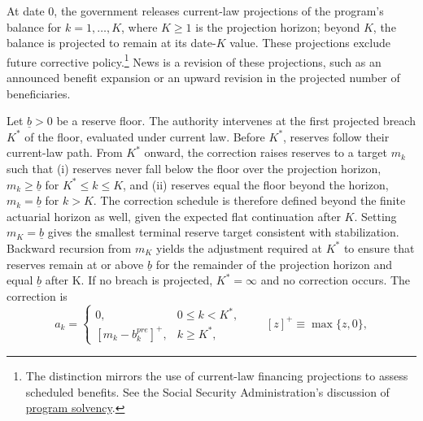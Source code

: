 \documentclass[12pt]{article}%
\theoremstyle{remark}
\begin{document}
At date 0, the government releases current-law projections of the program's balance for $k=1,\dots,K$, where $K\geq 1$ is the projection horizon; beyond $K$, the balance is projected to remain at its date-$K$ value. These projections exclude future corrective policy.\footnote{The distinction mirrors the use of current-law financing projections to assess scheduled benefits. See the Social Security Administration's discussion of \href{https://www.ssa.gov/policy/docs/ssb/v70n3/v70n3p111.html}{program solvency}.} News is a revision of these projections, such as an announced benefit expansion or an upward revision in the projected number of beneficiaries.

Let $\underline{b}>0$ be a reserve floor. The authority intervenes at the first projected breach $K^*$ of the floor, evaluated under current law. Before $K^*$, reserves follow their current-law path. From $K^*$ onward, the correction raises reserves to a target $m_k$ such that (i) reserves never fall below the floor over the projection horizon, $m_k\geq\underline{b}$ for $K^*\leq k\leq K$, and (ii) reserves equal the floor beyond the horizon, $m_k=\underline{b}$ for $k>K$. 
The correction schedule is therefore defined beyond the finite actuarial horizon as well, given the expected flat continuation after $K$. Setting $m_{K}=\underline b$ gives the smallest terminal reserve target consistent with stabilization. 
Backward recursion from $m_{K}$ yields the adjustment required at $K^*$ to ensure that reserves remain at or above $\underline b$ for the remainder of the projection horizon and equal $\underline b$ after K. 
If no breach is projected, $K^*=\infty$ and no correction occurs. The correction is
\begin{equation}\label{eq:rule}
a_k =
\begin{cases}
0, & 0\leq k<K^*,\\[2pt]
\left[m_k - b^{pre}_k\right]^+, & k\geq K^*,
\end{cases}
\qquad [z]^+\equiv\max\{z,0\},
\end{equation}
\end{document}

